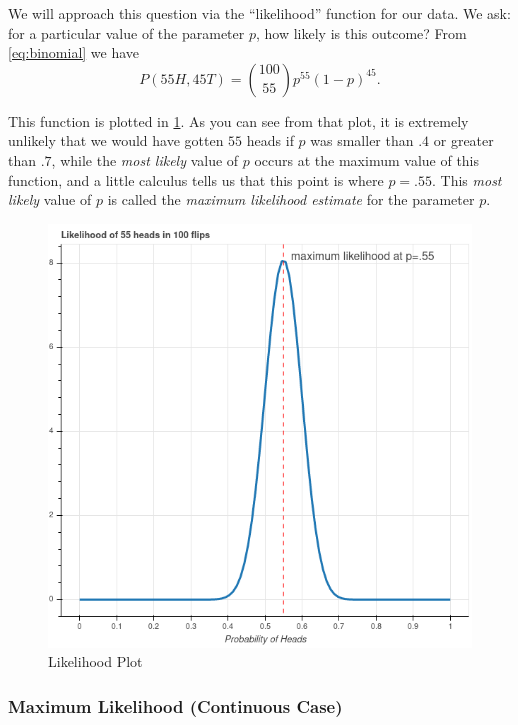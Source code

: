 \documentclass[
]{article}
\begin{document}
We will approach this question via the ``likelihood'' function for our
data. We ask: for a particular value of the parameter \(p\), how likely
is this outcome? From \cref{eq:binomial} we have \[
P(55H,45T)=\binom{100}{55}p^{55}(1-p)^{45}.
\]

This function is plotted in \cref{fig:beta}. As you can see from that
plot, it is extremely unlikely that we would have gotten \(55\) heads if
\(p\) was smaller than \(.4\) or greater than \(.7\), while the
\emph{most likely} value of \(p\) occurs at the maximum value of this
function, and a little calculus tells us that this point is where
\(p=.55\). This \emph{most likely} value of \(p\) is called the
\emph{maximum likelihood estimate} for the parameter \(p\).

\begin{figure}
\hypertarget{fig:beta}{%
\centering
\includegraphics{../img/beta.png}
\caption{Likelihood Plot}\label{fig:beta}
}
\end{figure}

\hypertarget{maximum-likelihood-continuous-case}{%
\subsubsection{Maximum Likelihood (Continuous
Case)}\label{maximum-likelihood-continuous-case}}
\end{document}
